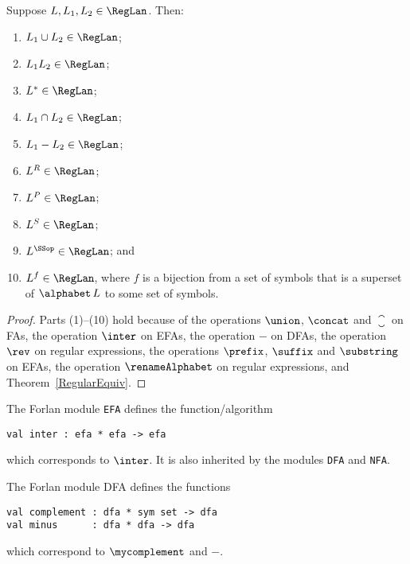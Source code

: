 \begin{theorem}
\label{ClosurePropTheorem}
Suppose $L,L_1,L_2\in\RegLan$.
Then:
\begin{enumerate}[\quad(1)]
\item $L_1\cup L_2\in\RegLan$;

\item $L_1L_2\in\RegLan$;

\item $L^*\in\RegLan$;

\item $L_1\cap L_2\in\RegLan$;

\item $L_1 - L_2\in\RegLan$;

\item $L^R\in\RegLan$;

\item $L^P\in\RegLan$;

\item $L^S\in\RegLan$;

\item $L^\SSop\in\RegLan$; and

\item $L^f\in\RegLan$, where $f$ is a bijection from a set of symbols
that is a superset of $\alphabet\,L$ to some set of symbols.
\end{enumerate}
\end{theorem}

\begin{proof}
Parts (1)--(10) hold because of the operations $\union$, $\concat$
and $\closure$ on FAs, the operation $\inter$ on EFAs, the
operation $\minus$ on DFAs, the operation $\rev$ on regular
expressions, the operations $\prefix$, $\suffix$ and $\substring$ on
EFAs, the operation $\renameAlphabet$ on regular expressions, and
Theorem~\ref{RegularEquiv}.
\end{proof}

The Forlan module \texttt{EFA} defines the function/algorithm
\begin{verbatim}
val inter : efa * efa -> efa
\end{verbatim}
which corresponds to $\inter$.  It is also inherited by the
modules \texttt{DFA} and \texttt{NFA}.

The Forlan module DFA defines the functions
\begin{verbatim}
val complement : dfa * sym set -> dfa
val minus      : dfa * dfa -> dfa
\end{verbatim}
which correspond to $\mycomplement$ and $\minus$.

